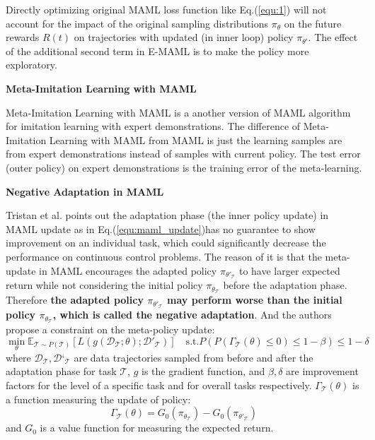 \documentclass{article}
\begin{document}
Directly optimizing original MAML loss function like Eq.(\ref{equ:1}) will not account for the impact of the original sampling distributions $\pi_\theta$ on the future rewards $R(t)$ on trajectories with updated (in inner loop) policy $\pi_{\theta '}$. The effect of the additional second term in E-MAML is to make the policy more exploratory.

\textbf{Meta-Imitation Learning with MAML}

Meta-Imitation Learning with MAML \cite{finn2017one} is a another version of MAML algorithm for imitation learning with expert demonstrations. The difference of Meta-Imitation Learning with MAML from MAML is just the learning samples are from expert demonstrations instead of samples with current policy. The test error (outer policy) on expert demonstrations is the training error of the meta-learning.

\textbf{Negative Adaptation in MAML}

Tristan et al. \cite{deleu2018effects} points out the adaptation phase (the inner policy update) in MAML update as in Eq.(\ref{equ:maml_update})has no guarantee to show improvement on an individual task,  which could significantly decrease the performance on continuous control problems. The reason of it is that the meta-update in MAML encourages the adapted policy $\pi_{\theta'_\mathcal{T}}$ to have larger expected return while not considering the initial policy $\pi_{\theta_\mathcal{T}}$ before the adaptation phase. Therefore \textbf{the adapted policy $\pi_{\theta'_\mathcal{T}}$ may perform worse than the initial policy $\pi_{\theta_\mathcal{T}}$, which is called the negative adaptation}. And the authors propose a constraint on the meta-policy update:
\begin{equation}
    \min_\theta\mathbb{E}_{\mathcal{T}\sim P(\mathcal{T})}[L(g(\mathcal{D_{\mathcal{T}};\theta});\mathcal{D}'_{\mathcal{T}})] \quad \text{s.t.} P(P(\Gamma_\mathcal{T}(\theta)\leq 0)\leq 1-\beta)\leq 1-\delta
\end{equation}
where $\mathcal{D_{\mathcal{T}}}, \mathcal{D‘_{\mathcal{T}}}$ are data trajectories sampled from before and after the adaptation phase for task $\mathcal{T}$, $g$ is the gradient function, and $\beta, \delta$ are improvement factors for the level of a specific task and for overall tasks respectively. $\Gamma_{\mathcal{T}}(\theta)$ is a function measuring the update of policy:
\begin{equation}
    \Gamma_{\mathcal{T}}(\theta)=G_0(\pi_{\theta_\mathcal{T}})-G_0(\pi_{\theta'_\mathcal{T}})
\end{equation}
and $G_0$ is a value function for measuring the expected return.
\end{document}
